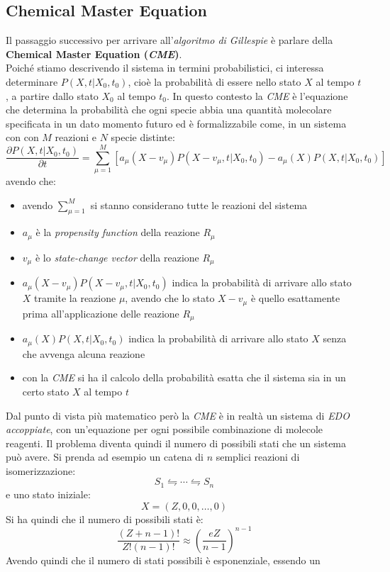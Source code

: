 \documentclass[a4paper,12pt, oneside]{book}
\begin{document}
\subsection{Chemical Master Equation}
Il passaggio successivo per arrivare all'\textit{algoritmo di Gillespie} è
parlare della \textbf{Chemical Master Equation (\textit{CME})}.\\
Poiché stiamo descrivendo il sistema in termini probabilistici, ci interessa
determinare $P(X,t|X_0, t_0)$, cioè la probabilità di essere nello stato $X$ al
tempo $t$, a partire dallo stato $X_0$ al tempo $t_0$. In questo contesto la
\textit{CME} è l'equazione che determina la probabilità che ogni specie abbia
una quantità molecolare specificata in un dato momento futuro ed è
formalizzabile come, in un sistema con con $M$ reazioni e $N$
specie distinte:
\[\frac{\partial P(X,t|X_0,t_0)}{\partial
    t}=\sum_{\mu=1}^M\left[a_\mu(X-v_\mu)P(X-v_\mu,t|X_0,t_0)-a_\mu(X)P(X,t|X_0,
    t_0)\right]\]
avendo che:
\begin{itemize}
  \item avendo $\sum_{\mu=1}^M$ si stanno considerano tutte le reazioni del
  sistema 
  \item $a_\mu$ è la \textit{propensity function} della reazione $R_\mu$
  \item $v_\mu$ è lo \textit{state-change vector} della reazione $R_\mu$
  \item $a_\mu(X-v_\mu)P(X-v_\mu,t|X_0,t_0)$ indica la probabilità di arrivare
  allo stato $X$ tramite la reazione $\mu$, avendo che lo stato $X-v_\mu$ è
  quello esattamente prima all'applicazione delle reazione $R_\mu$
  \item $a_\mu(X)P(X,t|X_0, t_0)$ indica la probabilità di arrivare
  allo stato $X$ senza che avvenga alcuna reazione
  \item con la \textit{CME} si ha il calcolo della probabilità esatta che il
  sistema sia in un certo stato $X$ al tempo $t$
\end{itemize}
Dal punto di vista più matematico però la \textit{CME} è in realtà un sistema di
\textit{EDO accoppiate}, con un'equazione per ogni possibile combinazione di
molecole reagenti. Il problema diventa quindi il numero di possibili stati che
un sistema può avere. Si prenda ad esempio un catena di $n$ semplici reazioni di
isomerizzazione:
\[S_1\leftrightharpoons \cdots \leftrightharpoons S_n\]
e uno stato iniziale:
\[X=(Z,0,0,\ldots, 0)\]
Si ha quindi che il numero di possibili stati è:
\[\frac{(Z+n-1)!}{Z!(n-1)!}\approx \left(\frac{eZ}{n-1}\right)^{n-1}\]
Avendo quindi che il numero di stati possibili è esponenziale, essendo un
\end{document}
